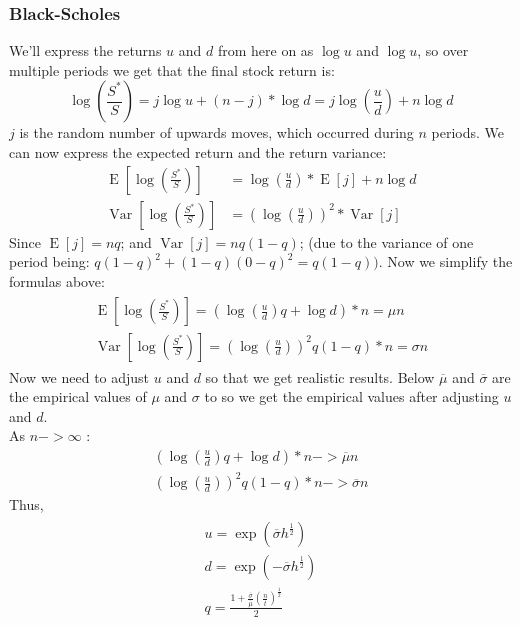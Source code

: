 \documentclass{article}
\DeclareMathOperator{\Var}{Var}
\DeclareMathOperator{\E}{E}
\begin{document}
\subsubsection{Black-Scholes}
We’ll express the returns $u$ and $d$ from here on as $\log u$ and $\log u$, so over multiple periods we get that the final stock return is:
\begin{equation}\label{eq:11}
    \log (\frac{S^{*}}{S}) =  j \log u + (n - j) * \log d = j \log \left(\frac{u}{d}\right) + n \log d
\end{equation}
$j$ is the random number of upwards moves, which occurred during $n$ periods. We can now express the expected return and the return variance:
\begin{align*}
    \E[\log (\frac{S^{*}}{S})] &= \log \left(\frac{u}{d}\right)*\E[j] + n \log d \\
    \Var[\log (\frac{S^{*}}{S})]& = (\log \left(\frac{u}{d}\right))^{2}*\Var[j]
\end{align*}
Since $\E[j] = n q$; and $\Var[j] = n q (1 - q)$; (due to the variance of one period being: $q(1-q)^{2} + (1-q)(0 - q)^{2} = q(1-q))$. Now we simplify the formulas above:
\begin{gather}
\begin{split}
    \E[\log (\frac{S^{*}}{S})] = (\log \left(\frac{u}{d}\right)q +\log d)*n  = \mu n \\
    \Var[\log (\frac{S^{*}}{S})] = (\log \left(\frac{u}{d}\right))^{2}q(1-q)*n = \sigma n
\end{split}
\end{gather}
Now we need to adjust $u$ and $d$ so that we get realistic results. Below $\overline{\mu}$ and $\overline{\sigma}$ are the empirical values of $\mu$ and $\sigma$ to so we get the empirical values after adjusting $u$ and $d$. \\ [3ex]
As $n -> \infty$ :
\begin{gather*}
    (\log \left(\frac{u}{d}\right)q +\log d)*n -> \overline{\mu}n \\
    (\log \left(\frac{u}{d}\right))^{2}q(1-q)*n -> \overline{\sigma} n
\end{gather*}
Thus, 
\begin{gather}
\begin{split}
    u = \exp\left(\overline{\sigma}h^{\frac{1}{2}}\right) \\
    d = \exp\left(-\overline{\sigma}h^{\frac{1}{2}}\right) \\
    q = \frac{1+\frac{\overline{\sigma}}{\overline{\mu}}\left(\frac{n}{t}\right)^{\frac{1}{2}}}{2}
\end{split}
\end{gather}
\end{document}
